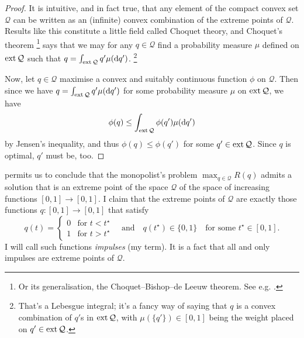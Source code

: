 \begin{proof}
	It is intuitive, and in fact true, that any element of the compact convex set $\mathcal{Q}$ can be written as an (infinite) convex combination of the extreme points of $\mathcal{Q}$.
	Results like this constitute a little field called Choquet theory,
	and Choquet's theorem%
		\footnote{Or its generalisation, the Choquet--Bishop--de Leeuw theorem. See e.g. \textcite{Phelps2001}.}
	says that
	we may for any $q \in \mathcal{Q}$ find a probability measure $\mu$ defined on $\operatorname*{ext} \mathcal{Q}$ such that $q = \int_{\operatorname*{ext} \mathcal{Q}} q' \mu(\mathrm{d} q')$.%
		\footnote{That's a Lebesgue integral;
		it's a fancy way of saying that $q$ is a convex combination of $q'$s in $\operatorname*{ext} \mathcal{Q}$, with $\mu(\{q'\}) \in [0,1]$ being the weight placed on $q' \in \operatorname*{ext} \mathcal{Q}$.}

	Now, let $q \in \mathcal{Q}$ maximise a convex and suitably continuous function $\phi$ on $\mathcal{Q}$.
	Then since we have $q = \int_{\operatorname*{ext} \mathcal{Q}} q' \mu(\mathrm{d} q')$ for some probability measure $\mu$ on $\operatorname*{ext} \mathcal{Q}$, we have
	\begin{equation*}
		\phi(q) \leq \int_{\operatorname*{ext} \mathcal{Q}} \phi(q') \mu(\mathrm{d} q') 
	\end{equation*}
	by Jensen's inequality,
	and thus $\phi(q) \leq \phi(q')$ for some $q' \in \operatorname*{ext} \mathcal{Q}$.
	Since $q$ is optimal, $q'$ must be, too.
\end{proof}


 permits us to conclude that the monopolist's problem $\max_{q \in \mathcal{Q}} R(q)$
admits a solution that is an extreme point of the space $\mathcal{Q}$ of the space of increasing functions $[0,1] \to [0,1]$.
I claim that the extreme points of $\mathcal{Q}$
are exactly those functions
 $q : [0,1] \to [0,1]$
that satisfy
%
\begin{equation*}
	q(t) =
	\begin{cases}
		0	& \text{for $t<t^\star$} \\
		1	& \text{for $t>t^\star$} 
	\end{cases}
	\quad \text{and} \quad q(t^\star) \in \{0,1\}
	\quad
	\text{for some $t^\star \in [0,1]$.}
\end{equation*}
%
I will call such functions \emph{impulses} (my term).
It is a fact that all and only impulses are extreme points of $\mathcal{Q}$.

